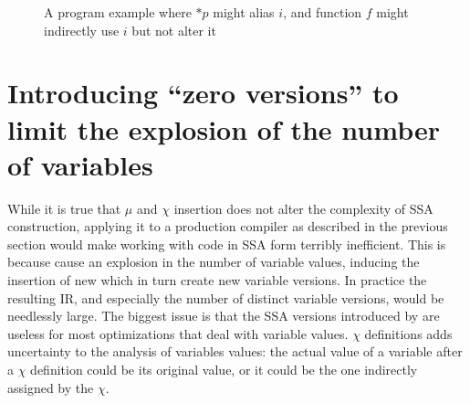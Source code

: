 \begin{figure}
%
%
\caption{\label{fig:hssa:muchi}A program example where $*p$ might alias $i$, and function $f$ might indirectly use $i$ but not alter it}
\end{figure}


\section{Introducing ``zero versions'' to limit the explosion of the number of variables}
While it is true that $\mu$ and $\chi$ insertion does not alter the complexity of SSA construction, applying it to a production compiler as described in the previous section would make working with code in SSA form terribly inefficient.
This is because \chiops cause an explosion in the number of variable values, inducing the insertion of new \phifuns which in turn create new variable versions.
In practice the resulting IR, and especially the number of distinct variable versions, would be needlessly large. The biggest issue is that the SSA versions introduced by \chiops are useless for most optimizations that deal with variable values. $\chi$ definitions adds uncertainty to the analysis of variables values: the actual value of a variable after a $\chi$ definition could be its original value, or it could be the one indirectly assigned by the $\chi$.

